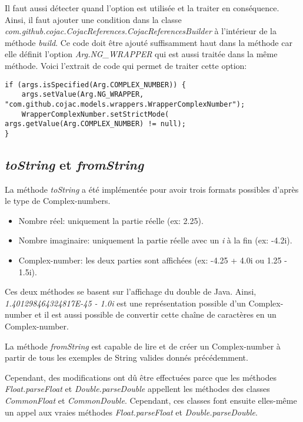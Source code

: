 Il faut aussi détecter quand l'option est utilisée et la traiter en conséquence. Ainsi, il faut ajouter une condition dans la classe \textit{com.github.cojac.CojacReferences.CojacReferencesBuilder} à l'intérieur de la méthode \textit{build}. Ce code doit être ajouté suffisamment haut dans la méthode car elle définit l'option \textit{Arg.NG\_WRAPPER} qui est aussi traitée dans la même méthode. Voici l'extrait de code qui permet de traiter cette option:

\begin{verbatim}
if (args.isSpecified(Arg.COMPLEX_NUMBER)) {
    args.setValue(Arg.NG_WRAPPER, "com.github.cojac.models.wrappers.WrapperComplexNumber");
    WrapperComplexNumber.setStrictMode( args.getValue(Arg.COMPLEX_NUMBER) != null);
}
\end{verbatim}

\subsection{\textit{toString} et \textit{fromString}}

La méthode \textit{toString} a été implémentée pour avoir trois formats possibles d'après le type de \glspl{Complex-number}.

\begin{itemize}
    \item Nombre réel: uniquement la partie réelle (ex: 2.25).
    \item Nombre imaginaire: uniquement la partie réelle avec un \textit{i} à la fin (ex: -4.2i).
    \item \Gls{Complex-number}: les deux parties sont affichées (ex: -4.25 + 4.0i ou 1.25 - 1.5i).
\end{itemize}

Ces deux méthodes se basent sur l'affichage du double de Java. Ainsi, \textit{1.401298464324817E-45 - 1.0i} est une représentation possible d'un \gls{Complex-number} et il est aussi possible de convertir cette chaîne de caractères en un \gls{Complex-number}.

La méthode \textit{fromString} est capable de lire et de créer un \gls{Complex-number} à partir de tous les exemples de String valides donnés précédemment.

Cependant, des modifications ont dû être effectuées parce que les méthodes \textit{Float.parseFloat} et \textit{Double.parseDouble} appellent les méthodes des classes \textit{CommonFloat} et \textit{CommonDouble}. Cependant, ces classes font ensuite elles-même un appel aux vraies méthodes \textit{Float.parseFloat} et \textit{Double.parseDouble}.

